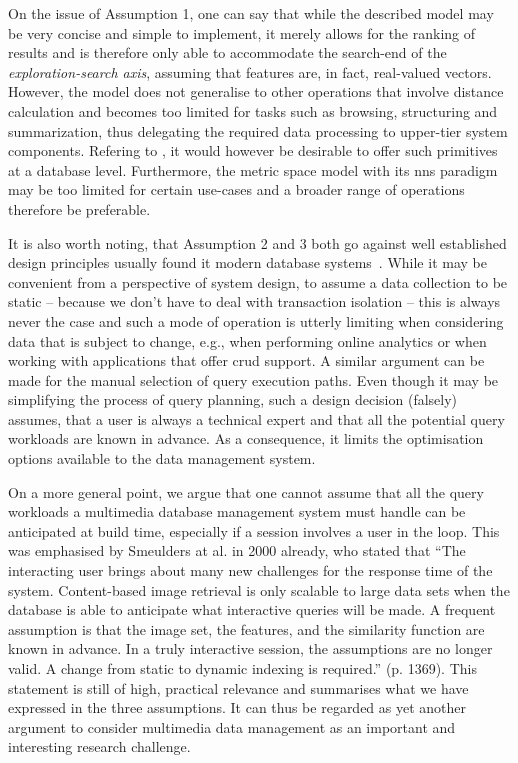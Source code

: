 On the issue of Assumption 1, one can say that while the described model may be very concise and simple to implement, it merely allows for the ranking of results and is therefore only able to accommodate the search-end of the \emph{exploration-search axis}, assuming that features are, in fact, real-valued vectors. However, the model does not generalise to other operations that involve distance calculation and becomes too limited for tasks such as browsing, structuring and summarization, thus delegating the required data processing to upper-tier system components. Refering to \cite{Jonson:2016Ten}, it would however be desirable to offer such primitives at a database level. Furthermore, the metric space model with its \acrfull{nns} paradigm may be too limited for certain use-cases and a broader range of operations therefore be preferable.

It is also worth noting, that Assumption 2 and 3 both go against well established design principles usually found it modern database systems~\cite{Petrov:2019Database,Amsaleg:2014Database}. While it may be convenient from a perspective of system design, to assume a data collection to be static -- because we don't have to deal with transaction isolation -- this is always never the case and such a mode of operation is utterly limiting when considering data that is subject to change, e.g., when performing online analytics or when working with applications that offer \acrshort{crud} support. A similar argument can be made for the manual selection of query execution paths. Even though it may be simplifying the process of query planning, such a design decision (falsely) assumes, that a user is always a technical expert and that all the potential query workloads are known in advance. As a consequence, it limits the optimisation options available to the data management system. 

On a more general point, we argue that one cannot assume that all the query workloads a multimedia database management system must handle can be anticipated at build time, especially if a session involves a user in the loop. This was emphasised by Smeulders at al. in 2000 already, who stated that ``The interacting user brings about many new challenges for the response time of the system. Content-based image retrieval is only scalable to large data sets when the database is able to anticipate what interactive queries will be made. A frequent assumption is that the image set, the features, and the similarity function are known in advance. In a truly interactive session, the assumptions are no longer valid. A change from static to dynamic indexing is required.'' \cite{Smeulders:2000Content} (p. 1369). This statement is still of high, practical relevance and summarises what we have expressed in the three assumptions. It can thus be regarded as yet another argument to consider multimedia data management as an important and interesting research challenge.

